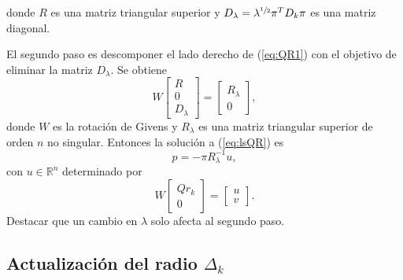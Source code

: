 \documentclass[11pt,a4paper]{book}
\theoremstyle{definition}
\theoremstyle{remark}
\begin{document}
donde $R$ es una matriz triangular superior y $D_\lambda=\lambda^{\sfrac{1}{2}}\pi^TD_k\pi$
es una matriz diagonal.

El segundo paso es descomponer el lado derecho de (\ref{eq:QR1}) con el objetivo de eliminar
la matriz $D_\lambda$. Se obtiene
\begin{equation}\label{eq:QR2}
	W\left[
	\begin{array}{c}
		R \\
		0 \\
		D_\lambda
	\end{array}
	\right]
	=
	\left[
	\begin{array}{c}
		R_\lambda \\
		0
	\end{array}
	\right],
\end{equation}
donde $W$ es la rotación de Givens y $R_\lambda$ es una matriz triangular superior de orden $n$
no singular. Entonces la solución a (\ref{eq:lsQR}) es
\begin{equation}\label{eq:solQR}
p=-\pi R_\lambda^{-1}u,
\end{equation}
con $u\in \mathbb{R}^n$ determinado por
\begin{equation}\label{eq:QR3}
	W\left[
	\begin{array}{c}
		Qr_k \\
		0 
	\end{array}
	\right]
	= \left[
	\begin{array}{c}
		u\\
		v
	\end{array}
	\right].
\end{equation}
Destacar que un cambio en $\lambda$ solo afecta al segundo paso.

\subsection{Actualización del radio $\Delta_k$}
\end{document}
